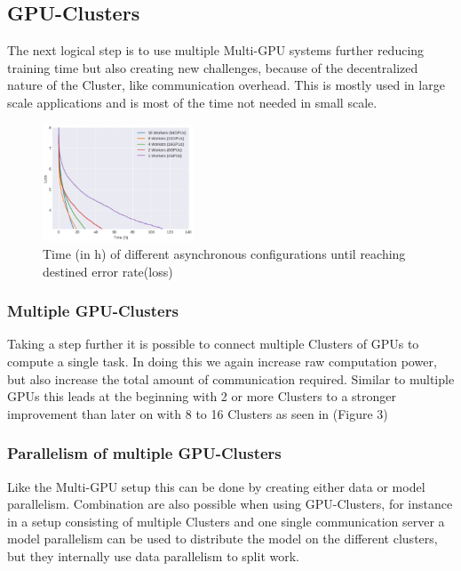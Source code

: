\documentclass[conference]{IEEEtran}
\begin{document}
\subsection{GPU-Clusters}

The next logical step is to use multiple Multi-GPU systems further reducing training time but also creating new challenges, because of the decentralized nature of the Cluster, like communication overhead.  This is mostly used in large scale applications and is most of the time not needed in small scale.

\begin{figure}
\centering
\includegraphics[width=0.4\textwidth]{gpu_cluster_perf_win.png}
\caption{Time (in h) of different asynchronous configurations until reaching destined error rate(loss)\cite{sastre2017scalability}}
\label{fig_cl_gpus}
\end{figure}

\subsubsection{Multiple GPU-Clusters}
Taking a step further it is possible to connect multiple Clusters of GPUs to compute a single task. In doing this we again increase raw computation power, but also increase the total amount of communication required. Similar to multiple GPUs this leads at the beginning with 2 or more Clusters to a stronger improvement than later on with 8 to 16 Clusters as seen in (Figure 3)

\subsubsection{Parallelism of multiple GPU-Clusters}
Like the Multi-GPU setup this can be done by creating either data or model parallelism. Combination are also possible when using GPU-Clusters, for instance in a setup consisting of multiple Clusters and one single communication server a model parallelism can be used to distribute the model on the different clusters, but they internally use data parallelism to split work\cite{wang2016deep}.
\end{document}
